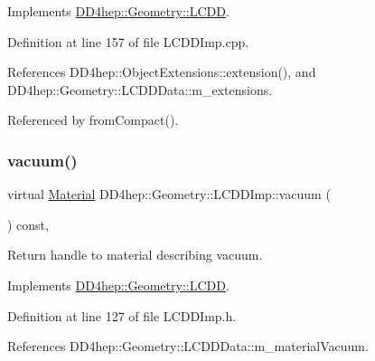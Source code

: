 Implements \hyperlink{class_d_d4hep_1_1_geometry_1_1_l_c_d_d_a699d446afe8b33487cdce57d4e2f26c6}{D\+D4hep\+::\+Geometry\+::\+L\+C\+DD}.



Definition at line 157 of file L\+C\+D\+D\+Imp.\+cpp.



References D\+D4hep\+::\+Object\+Extensions\+::extension(), and D\+D4hep\+::\+Geometry\+::\+L\+C\+D\+D\+Data\+::m\+\_\+extensions.



Referenced by from\+Compact().

\hypertarget{class_d_d4hep_1_1_geometry_1_1_l_c_d_d_imp_a9698f9c67fb45a886df6bfd7b2473bfe}{}\label{class_d_d4hep_1_1_geometry_1_1_l_c_d_d_imp_a9698f9c67fb45a886df6bfd7b2473bfe} 
\subsubsection{\texorpdfstring{vacuum()}{vacuum()}}
{\footnotesize\ttfamily virtual \hyperlink{class_d_d4hep_1_1_geometry_1_1_material}{Material} D\+D4hep\+::\+Geometry\+::\+L\+C\+D\+D\+Imp\+::vacuum (\begin{DoxyParamCaption}{ }\end{DoxyParamCaption}) const\hspace{0.3cm}{\ttfamily [inline]}, {\ttfamily [virtual]}}



Return handle to material describing vacuum. 



Implements \hyperlink{class_d_d4hep_1_1_geometry_1_1_l_c_d_d_adf89eaa970c7c23b6896f79a6ad28b7f}{D\+D4hep\+::\+Geometry\+::\+L\+C\+DD}.



Definition at line 127 of file L\+C\+D\+D\+Imp.\+h.



References D\+D4hep\+::\+Geometry\+::\+L\+C\+D\+D\+Data\+::m\+\_\+material\+Vacuum.

\hypertarget{class_d_d4hep_1_1_geometry_1_1_l_c_d_d_imp_ae2b0ac78fccc1b8a61661de2f8df03f4}{}\label{class_d_d4hep_1_1_geometry_1_1_l_c_d_d_imp_ae2b0ac78fccc1b8a61661de2f8df03f4} 

